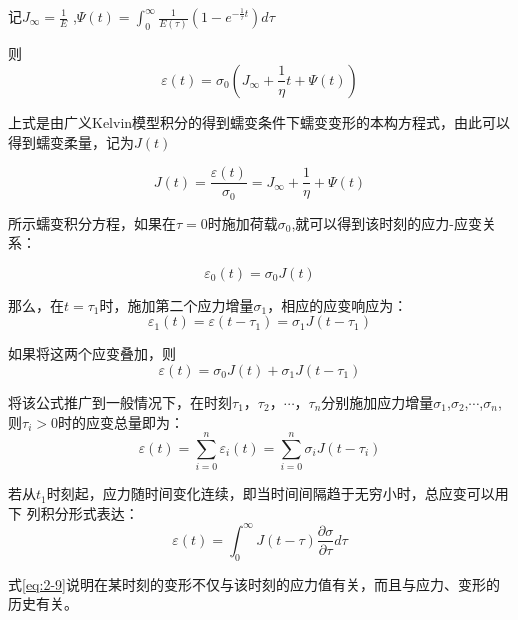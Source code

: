 记$J_\infty=\frac{1}{E}$ ,$\Psi(t)=\int_{0}^{\infty} \frac{1}{E(\tau)}(1-e^{-\frac{1}{\tau}t}) d{\tau}$

则
\begin{equation}
     {\varepsilon(t)}={\sigma_0}(J_\infty+\frac{1}{\eta}t+\Psi(t))
\end{equation}

上式是由广义Kelvin模型积分的得到蠕变条件下蠕变变形的本构方程式，由此可以得到蠕变柔量，记为$J(t)$

\begin{equation}
J(t)=\frac{\varepsilon(t)}{\sigma_0}
    =J_\infty+\frac{1}{\eta}+\Psi(t)
\end{equation}

所示蠕变积分方程，如果在$\tau=0$时施加荷载$\sigma_0$,就可以得到该时刻的应力-应变关系：

\begin{equation}
{\varepsilon_0(t)}={\sigma_0}{J(t)}
\end{equation}

那么，在$t=\tau_1$时，施加第二个应力增量$\sigma_1$，相应的应变响应为：
\begin{equation}
{\varepsilon_1(t)}={\varepsilon(t-\tau_1)}={\sigma_1}{J(t-\tau_1)}
\end{equation}

如果将这两个应变叠加，则
\begin{equation}
     {\varepsilon(t)}={\sigma_0}{J(t)}+{\sigma_1}{J(t-\tau_1)}
\end{equation}

将该公式推广到一般情况下，在时刻$\tau_1$，$\tau_2$，$\cdots$，$\tau_n$分别施加应力增量$\sigma_1$,$\sigma_2$,$\cdots$,$\sigma_n$,则$\tau_i>0$时的应变总量即为：
\begin{equation}
     {\varepsilon(t)}=\sum_{i=0}^n\varepsilon_i(t)=\sum_{i=0}^n\sigma_iJ(t-\tau_i)
\end{equation}

若从$t_1$时刻起，应力随时间变化连续，即当时间间隔趋于无穷小时，总应变可以用下
列积分形式表达：
\begin{equation}
     {\varepsilon(t)}=\int_{0}^{\infty}J(t-\tau)\frac{\partial\sigma}{\partial\tau}d\tau
     \label{eq:2-9}
\end{equation}

式\ref{eq:2-9}说明在某时刻的变形不仅与该时刻的应力值有关，而且与应力、变形的历史有关。

